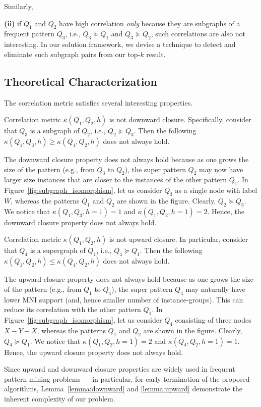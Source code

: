 Similarly, {{\bf (ii)} if $Q_1$ and $Q_2$ have high correlation {\em only} because they are subgraphs of a frequent
pattern $Q_3$, i.e., $Q_3 \succeq Q_1$ and $Q_3 \succeq Q_2$, such correlations are also not interesting. In our solution
framework, we devise a technique to detect and eliminate such subgraph pairs from our top-$k$ result.
%
%
\subsection{Theoretical Characterization}
\label{sec:characteristics}
%
The correlation metric satisfies several interesting properties.
%
\begin{lma}
\label{lemma:downward}
Correlation metric $\kappa(Q_1,Q_2,h)$ is not downward closure. Specifically, consider that $Q_3$ is a subgraph of $Q_2$, i.e.,
$Q_2 \succeq Q_3$. Then the following $\kappa(Q_1,Q_3,h) \ge \kappa(Q_1,Q_2,h)$ does not always hold.
\end{lma}
%
The downward closure property does not always hold because as one grows the size of the pattern (e.g., from $Q_3$ to $Q_2$), the super pattern
$Q_2$ may now have larger size instances that are closer to the instances of the other pattern $Q_1$.
In Figure~\ref{fig:subgraph_isomorphism}, let us consider
$Q_3$ as a single node with label $W$, whereas the patterns $Q_1$ and $Q_2$ are shown in the figure. Clearly, $Q_2 \succeq Q_3$.
We notice that $\kappa(Q_1,Q_3,h=1)=1$ and $\kappa(Q_1,Q_2,h=1)=2$. Hence, the downward closure property does not always hold.
%
\begin{lma}
\label{lemma:upward}
Correlation metric $\kappa(Q_1,Q_2,h)$ is not upward closure. In particular, consider that $Q_4$ is a supergraph of $Q_1$, i.e.,
$Q_4 \succeq Q_1$. Then the following $\kappa(Q_1,Q_2,h) \le \kappa(Q_4,Q_2,h)$ does not always hold.
\end{lma}
%
The upward closure property does not always hold because as one grows the size of the pattern (e.g., from $Q_1$ to $Q_4$), the super pattern
$Q_4$ may naturally have lower MNI support (and, hence smaller number of instance-groups).
This can reduce its correlation with the other pattern $Q_1$.
In Figure~\ref{fig:subgraph_isomorphism}, let us consider $Q_4$ consisting of three nodes $X-Y-X$,
whereas the patterns $Q_1$ and $Q_2$ are shown in the figure. Clearly, $Q_4 \succeq Q_1$.
We notice that $\kappa(Q_1,Q_2,h=1)=2$ and $\kappa(Q_4,Q_2,h=1)=1$. Hence, the upward closure property does not always hold.

Since upward and downward closure properties are widely used in frequent pattern mining problems \cite{AS94,KK01,BN08,FB07,KK04,YH02}
--- in particular, for early termination of the proposed algorithms, Lemma~\ref{lemma:downward} and \ref{lemma:upward} demonstrate the inherent
complexity of our {} problem.

}
